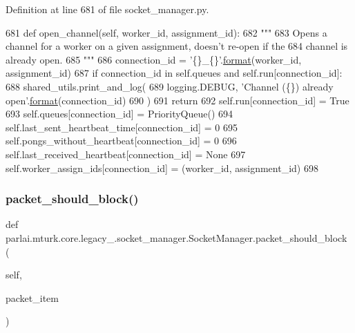 Definition at line 681 of file socket\+\_\+manager.\+py.


\begin{DoxyCode}
681     \textcolor{keyword}{def }open\_channel(self, worker\_id, assignment\_id):
682         \textcolor{stringliteral}{"""}
683 \textcolor{stringliteral}{        Opens a channel for a worker on a given assignment, doesn't re-open if the}
684 \textcolor{stringliteral}{        channel is already open.}
685 \textcolor{stringliteral}{        """}
686         connection\_id = \textcolor{stringliteral}{'\{\}\_\{\}'}.\hyperlink{namespaceparlai_1_1chat__service_1_1services_1_1messenger_1_1shared__utils_a32e2e2022b824fbaf80c747160b52a76}{format}(worker\_id, assignment\_id)
687         \textcolor{keywordflow}{if} connection\_id \textcolor{keywordflow}{in} self.queues \textcolor{keywordflow}{and} self.run[connection\_id]:
688             shared\_utils.print\_and\_log(
689                 logging.DEBUG, \textcolor{stringliteral}{'Channel (\{\}) already open'}.\hyperlink{namespaceparlai_1_1chat__service_1_1services_1_1messenger_1_1shared__utils_a32e2e2022b824fbaf80c747160b52a76}{format}(connection\_id)
690             )
691             \textcolor{keywordflow}{return}
692         self.run[connection\_id] = \textcolor{keyword}{True}
693         self.queues[connection\_id] = PriorityQueue()
694         self.last\_sent\_heartbeat\_time[connection\_id] = 0
695         self.pongs\_without\_heartbeat[connection\_id] = 0
696         self.last\_received\_heartbeat[connection\_id] = \textcolor{keywordtype}{None}
697         self.worker\_assign\_ids[connection\_id] = (worker\_id, assignment\_id)
698 
\end{DoxyCode}
\mbox{\label{classparlai_1_1mturk_1_1core_1_1legacy__2018_1_1socket__manager_1_1SocketManager_a8793f6a47fa15f3b76b3660240563492}} 
\subsubsection{\texorpdfstring{packet\+\_\+should\+\_\+block()}{packet\_should\_block()}}
{\footnotesize\ttfamily def parlai.\+mturk.\+core.\+legacy\+\_.\+socket\+\_\+manager.\+Socket\+Manager.\+packet\+\_\+should\+\_\+block (\begin{DoxyParamCaption}\item[{}]{self,  }\item[{}]{packet\+\_\+item }\end{DoxyParamCaption})}

